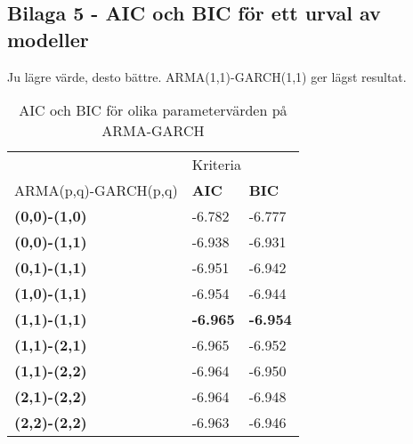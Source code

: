 \documentclass[12pt]{article}
\begin{document}
\subsection{Bilaga 5 - AIC och BIC för ett urval av modeller}
Ju lägre värde, desto bättre. ARMA(1,1)-GARCH(1,1) ger lägst resultat.
\begin{table}[H]
\caption{AIC och BIC för olika parametervärden på ARMA-GARCH}
\begin{tabular}{||lll||}
\hline
& \multicolumn{2}{l||}{Kriteria} \\
ARMA(p,q)-GARCH(p,q) & \textbf{AIC} & \textbf{BIC}\\ \hline\hline
{\textbf{(0,0)-(1,0)}} & -6.782  & -6.777 \\ \cline{2-3} 
{\textbf{(0,0)-(1,1)}} & -6.938  & -6.931 \\ \cline{2-3}
{\textbf{(0,1)-(1,1)}} & -6.951  & -6.942 \\ \cline{2-3} 
{\textbf{(1,0)-(1,1)}} & -6.954  & -6.944 \\ \cline{2-3} 
{\textbf{(1,1)-(1,1)}} & \textbf{-6.965}  & \textbf{-6.954} \\ \cline{2-3} 
{\textbf{(1,1)-(2,1)}} & -6.965  & -6.952 \\ \cline{2-3} 
{\textbf{(1,1)-(2,2)}} & -6.964  & -6.950 \\ \cline{2-3}
{\textbf{(2,1)-(2,2)}} & -6.964  & -6.948 \\ \cline{2-3} 
{\textbf{(2,2)-(2,2)}} & -6.963  & -6.946 \\ \hline
\end{tabular}
\end{table}

\newpage
\printbibliography
\end{document}
